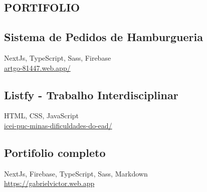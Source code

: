 \begin{framed}
    \section{PORTIFOLIO}
      \small\subsection{Sistema de Pedidos de Hamburgueria}
      \footnotesize{NextJs, TypeScript, Sass, Firebase}\\
      \href{https://artgo-81447.web.app/}{artgo-81447.web.app/}

      \small\subsection{Listfy - Trabalho Interdisciplinar}
      \footnotesize{HTML, CSS, JavaScript}\\
      \href{https://icei-puc-minas-pples-ti.github.io/plf-es-2021-1-ti1-7924100-dificuldades-do-ead/}{icei-puc-minas-dificuldades-do-ead/}

      \small\subsection{Portifolio completo}
      \footnotesize{NextJs, Firebase, TypeScript, Sass, Markdown}\\
      \href{https://gabrielvictor.web.app}{https://gabrielvictor.web.app}
  \end{framed}

